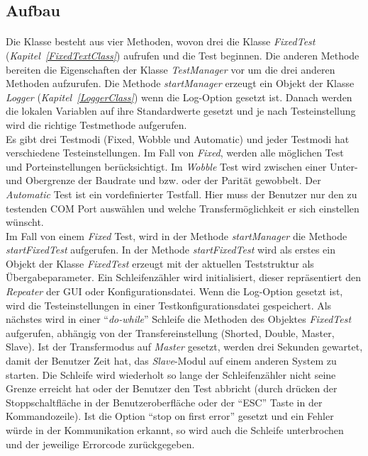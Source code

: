 \subsection{Aufbau}
\paragraph{}
Die Klasse besteht aus vier Methoden, wovon drei die Klasse \textit{FixedTest} (\textit{Kapitel~\ref{FixedTextClass}}) aufrufen und die Test beginnen. Die anderen Methode bereiten die Eigenschaften der Klasse \textit{TestManager} vor um die drei anderen Methoden aufzurufen. Die Methode \textit{startManager} erzeugt ein Objekt der Klasse \textit{Logger} (\textit{Kapitel~\ref{LoggerClass}}) wenn die Log-Option gesetzt ist. Danach werden die lokalen Variablen auf ihre Standardwerte gesetzt und je nach Testeinstellung wird die richtige Testmethode aufgerufen.\\

Es gibt drei Testmodi (Fixed, Wobble und Automatic) und jeder Testmodi hat verschiedene Testeinstellungen. Im Fall von \textit{Fixed}, werden alle möglichen Test und Porteinstellungen berücksichtigt. Im \textit{Wobble} Test wird zwischen einer Unter- und Obergrenze der Baudrate und bzw. oder der Parität gewobbelt. Der \textit{Automatic} Test ist ein vordefinierter Testfall. Hier muss der Benutzer nur den zu testenden COM Port auswählen und welche Transfermöglichkeit er sich einstellen wünscht.\\


Im Fall von einem \textit{Fixed} Test, wird in der Methode \textit{startManager} die Methode \textit{startFixedTest} aufgerufen. In der Methode \textit{startFixedTest} wird als erstes ein Objekt der Klasse \textit{FixedTest} erzeugt mit der aktuellen Teststruktur als Übergabeparameter. Ein Schleifenzähler wird initialisiert, dieser repräsentiert den \textit{Repeater} der GUI oder Konfigurationsdatei. Wenn die Log-Option gesetzt ist, wird die Testeinstellungen in einer Testkonfigurationsdatei gespeichert. Als nächstes wird in einer "`\textit{do-while}"' Schleife die Methoden des Objektes \textit{FixedTest} aufgerufen, abhängig von der  Transfereinstellung (Shorted, Double, Master, Slave). Ist der Transfermodus auf \textit{Master} gesetzt, werden drei Sekunden gewartet, damit der Benutzer Zeit hat, das \textit{Slave}-Modul auf einem anderen System zu starten. Die Schleife wird wiederholt so lange der Schleifenzähler nicht seine Grenze erreicht hat oder der Benutzer den Test abbricht (durch drücken der Stoppschaltfläche in der Benutzeroberfläche oder der "`ESC"' Taste in der Kommandozeile). Ist die Option "`stop on first error"' gesetzt und ein Fehler würde in der Kommunikation erkannt, so wird auch die Schleife unterbrochen und der jeweilige Errorcode zurückgegeben.\\


